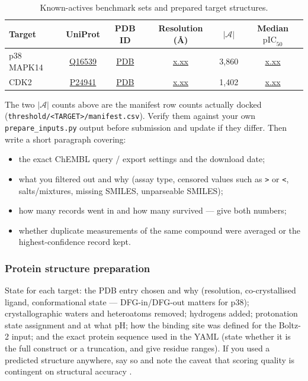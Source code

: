 \documentclass[11pt]{article}
\newcommand{\FILL}[1]{\textcolor{blue!65!black}{\underline{\textsf{#1}}}}
\newcommand{\pICfifty}{\mathrm{pIC}_{50}}
\newcommand{\Actives}{\mathcal{A}}              %
\begin{document}
\begin{table}[t]
\centering
\caption{Known-actives benchmark sets and prepared target structures.}
\label{tab:datasets}
\small
\begin{tabular}{lccccc}
\toprule
Target & UniProt & PDB ID & Resolution (\si{\angstrom}) & $|\Actives|$ & Median $\pICfifty$ \\
\midrule
p38 MAPK14 & \FILL{Q16539} & \FILL{PDB} & \FILL{x.xx} & 3{,}860 & \FILL{x.xx} \\
CDK2       & \FILL{P24941} & \FILL{PDB} & \FILL{x.xx} & 1{,}402 & \FILL{x.xx} \\
\bottomrule
\end{tabular}
\end{table}

\begin{yourturn}
The two $|\Actives|$ counts above are the manifest row counts actually docked
(\texttt{threshold/<TARGET>/manifest.csv}). Verify them against your own
\texttt{prepare\_inputs.py} output before submission and update if they differ.
Then write a short paragraph covering:
\begin{itemize}\itemsep0pt
  \item the exact ChEMBL query / export settings and the download date;
  \item what you filtered out and why (assay type, censored values such as
        \texttt{>} or \texttt{<}, salts/mixtures, missing SMILES,
        unparseable SMILES);
  \item how many records went in and how many survived --- give both numbers;
  \item whether duplicate measurements of the same compound were averaged or
        the highest-confidence record kept.
\end{itemize}
\end{yourturn}

\subsubsection{Protein structure preparation}

\begin{yourturn}
State for each target: the PDB entry chosen and why (resolution,
co-crystallised ligand, conformational state --- DFG-in/DFG-out matters for
p38); crystallographic waters and heteroatoms removed; hydrogens added;
protonation state assignment and at what pH; how the binding site was defined
for the Boltz-2 input; and the exact protein sequence used in the YAML
(state whether it is the full construct or a truncation, and give residue
ranges). If you used a predicted structure anywhere, say so and note the
caveat that scoring quality is contingent on structural accuracy
\citep{abramson2024}.
\end{yourturn}
\end{document}
